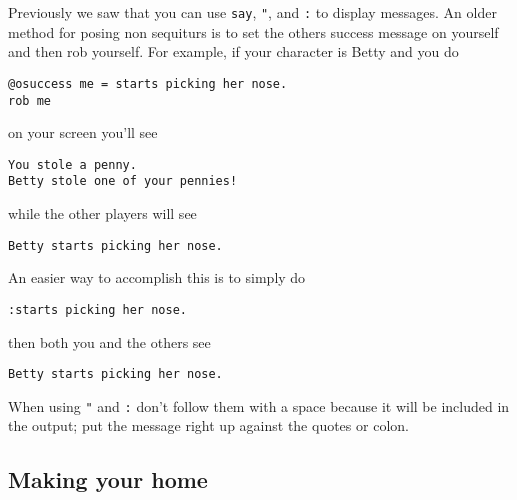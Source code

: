 Previously we saw that you can use {\tt say}, \verb|"|, and \verb|:|
to display messages.  An older method for posing non sequiturs is to
set the others success message on yourself and then rob yourself.  For
example, if your character is Betty and you do
\begin{verbatim}
@osuccess me = starts picking her nose.
rob me
\end{verbatim}
on your screen you'll see
\begin{verbatim}
You stole a penny.
Betty stole one of your pennies!
\end{verbatim}
while the other players will see
\begin{verbatim}
Betty starts picking her nose.
\end{verbatim}
An easier way to accomplish this is to simply do
\begin{verbatim}
:starts picking her nose.
\end{verbatim}
then both you and the others see
\begin{verbatim}
Betty starts picking her nose.
\end{verbatim}
When using \verb|"| and \verb|:| don't follow them with a space
because it will be included in the output; put the message right up
against the quotes or colon.

\subsection{Making your home}
\label{sec:making-your-home}


